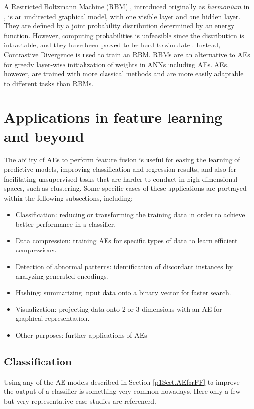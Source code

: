 A Restricted Boltzmann Machine (RBM) , introduced originally as \textit{harmonium} in , is an undirected graphical model, with one visible layer and one hidden layer. They are defined by a joint probability distribution determined by an energy function.
However, computing probabilities is unfeasible since the distribution is intractable, and they have been proved to be hard to simulate . Instead, Contrastive Divergence  is used to train an RBM. RBMs are an alternative to AEs for greedy layer-wise initialization of weights in ANNs including AEs. AEs, however, are trained with more classical methods and are more easily adaptable to different tasks than RBMs.

\section{Applications in feature learning and beyond}\label{p1Sec.Applications}

The ability of AEs to perform feature fusion is useful for easing the learning of predictive models, improving classification and regression results, and also for facilitating unsupervised tasks that are harder to conduct in high-dimensional spaces, such as clustering. Some specific cases of these applications are portrayed within the following subsections, including:
\begin{itemize}
  \setlength\itemsep{-.2em}
\item Classification: reducing or transforming the training data in order to achieve better performance in a classifier.
\item Data compression: training AEs for specific types of data to learn efficient compressions.
\item Detection of abnormal patterns: identification of discordant instances by analyzing generated encodings.
\item Hashing: summarizing input data onto a binary vector for faster search.
\item Visualization: projecting data onto 2 or 3 dimensions with an AE for graphical representation.
\item Other purposes: further applications of AEs.
\end{itemize}

\subsection{Classification}
Using any of the AE models described in Section \ref{p1Sect.AEforFF} to improve the output of a classifier is something very common nowadays. Here only a few but very representative case studies are referenced.

